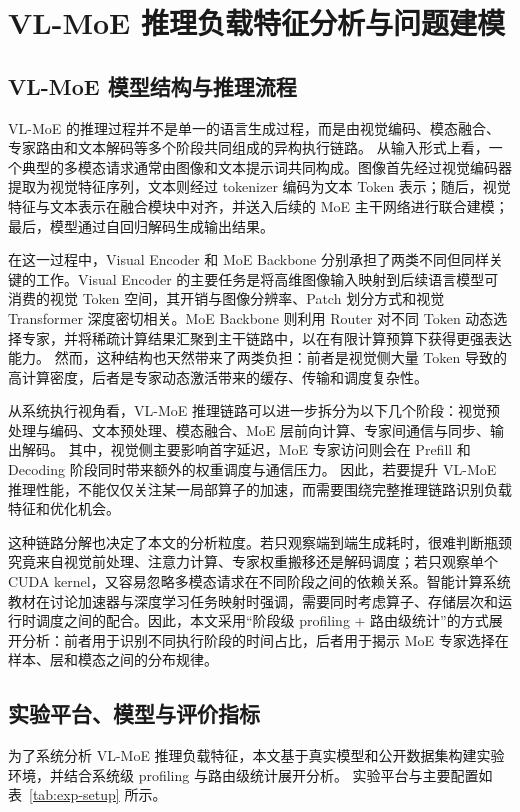 \chapter{VL-MoE 推理负载特征分析与问题建模}
\label{chap:analysis}

\section{VL-MoE 模型结构与推理流程}
VL-MoE 的推理过程并不是单一的语言生成过程，而是由视觉编码、模态融合、专家路由和文本解码等多个阶段共同组成的异构执行链路。
从输入形式上看，一个典型的多模态请求通常由图像和文本提示词共同构成。图像首先经过视觉编码器提取为视觉特征序列，文本则经过 tokenizer 编码为文本 Token 表示；随后，视觉特征与文本表示在融合模块中对齐，并送入后续的 MoE 主干网络进行联合建模；最后，模型通过自回归解码生成输出结果。

在这一过程中，Visual Encoder 和 MoE Backbone 分别承担了两类不同但同样关键的工作。Visual Encoder 的主要任务是将高维图像输入映射到后续语言模型可消费的视觉 Token 空间，其开销与图像分辨率、Patch 划分方式和视觉 Transformer 深度密切相关。MoE Backbone 则利用 Router 对不同 Token 动态选择专家，并将稀疏计算结果汇聚到主干链路中，以在有限计算预算下获得更强表达能力。
然而，这种结构也天然带来了两类负担：前者是视觉侧大量 Token 导致的高计算密度，后者是专家动态激活带来的缓存、传输和调度复杂性。

从系统执行视角看，VL-MoE 推理链路可以进一步拆分为以下几个阶段：视觉预处理与编码、文本预处理、模态融合、MoE 层前向计算、专家间通信与同步、输出解码。
其中，视觉侧主要影响首字延迟，MoE 专家访问则会在 Prefill 和 Decoding 阶段同时带来额外的权重调度与通信压力。
因此，若要提升 VL-MoE 推理性能，不能仅仅关注某一局部算子的加速，而需要围绕完整推理链路识别负载特征和优化机会。

这种链路分解也决定了本文的分析粒度。若只观察端到端生成耗时，很难判断瓶颈究竟来自视觉前处理、注意力计算、专家权重搬移还是解码调度；若只观察单个 CUDA kernel，又容易忽略多模态请求在不同阶段之间的依赖关系。智能计算系统教材在讨论加速器与深度学习任务映射时强调，需要同时考虑算子、存储层次和运行时调度之间的配合\cite{chen2024intelligentcomputing}。因此，本文采用“阶段级 profiling + 路由级统计”的方式展开分析：前者用于识别不同执行阶段的时间占比，后者用于揭示 MoE 专家选择在样本、层和模态之间的分布规律。

\section{实验平台、模型与评价指标}
为了系统分析 VL-MoE 推理负载特征，本文基于真实模型和公开数据集构建实验环境，并结合系统级 profiling 与路由级统计展开分析。
实验平台与主要配置如表~\ref{tab:exp-setup} 所示。

